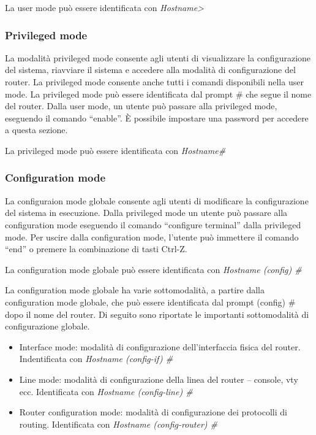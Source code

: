 La user mode può essere identificata con \emph{Hostname>}

\subsubsection{Privileged mode}
La modalità privileged mode consente agli utenti di visualizzare la configurazione del sistema, riavviare il sistema e accedere alla modalità di configurazione del router. La privileged mode consente anche tutti i comandi disponibili nella user mode. La privileged mode può essere identificata dal prompt \# che segue il nome del router. Dalla user mode, un utente può passare alla privileged mode, eseguendo il comando “enable”. È possibile impostare una password per accedere a questa sezione.

La privileged mode può essere identificata con \emph{Hostname\#}


\subsubsection{Configuration mode}
La configuraion mode globale consente agli utenti di modificare la configurazione del sistema in esecuzione. Dalla privileged mode un utente può passare alla configuration mode eseguendo il comando “configure terminal” dalla privileged mode. Per uscire dalla configuration mode, l’utente può immettere il comando “end” o premere la combinazione di tasti Ctrl-Z.

La configuration mode  globale può essere identificata con \emph{Hostname (config) \#}

La configuration mode globale ha varie sottomodalità, a partire dalla configuration mode globale, che può essere identificata dal prompt (config) \# dopo il nome del router. Di seguito sono riportate le importanti sottomodalità di configurazione globale.

\begin{itemize}
    \item Interface mode: modalità di configurazione dell’interfaccia fisica del router. Indentificata con \emph{Hostname (config-if) \#}
    \item Line mode: modalità di configurazione della linea del router – console, vty ecc. Identificata con \emph{Hostname (config-line) \#}
    \item Router configuration mode: modalità di configurazione dei protocolli di routing. Identificata con \emph{Hostname (config-router) \#}
\end{itemize}

